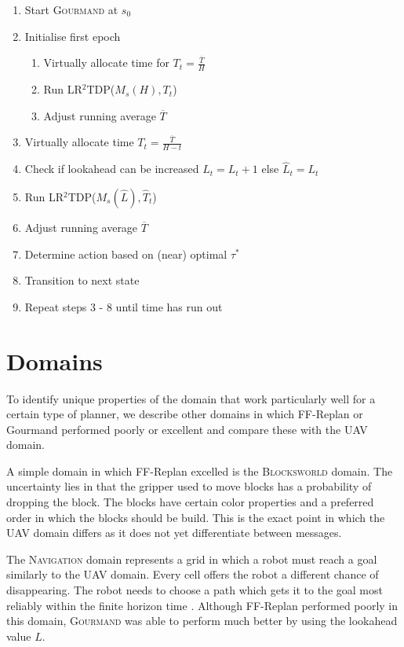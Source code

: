 \documentclass[runningheads,a4paper]{llncs}
\begin{document}
\begin{enumerate}
	\item Start \textsc{Gourmand} at $s_0$
	\item Initialise first epoch
	\begin{enumerate}
		\item Virtually allocate time for  $T_t = \frac{\overline{T}}{H}$
		\item Run LR$^2$TDP($M_s(H), T_t$)
		\item Adjust running average $\overline{T}$
	\end{enumerate}
	\item Virtually allocate time  $T_t = \frac{\overline{T}}{H - t}$
	\item Check if lookahead can be increased $\widehat{L}_t = L_t + 1$ else $\widehat{L}_t = L_t $
	\item Run LR$^2$TDP($M_s(\widehat{L}), \widehat{T}_t$)
	\item Adjust running average $\overline{T}$
	\item Determine action based on (near) optimal $\tau^*$
	\item Transition to next state
	\item Repeat steps 3 - 8 until time has run out
\end{enumerate}


\section{Domains}
\label{sec:domains}

To identify unique properties of the domain that work particularly well for a certain type of planner, we describe
other domains in which FF-Replan or Gourmand performed poorly or excellent and compare these with the UAV domain.

A simple domain in which FF-Replan excelled is the \textsc{Blocksworld}
domain. The uncertainty lies in that the gripper used to move blocks has a
probability of dropping the block. The blocks have certain color properties and
a preferred order in which the blocks should be build. This is the exact point
in which the UAV domain differs as it does not yet differentiate between messages.

The \textsc{Navigation} domain represents a grid in which a robot must reach a goal similarly to the UAV domain.
Every cell offers the robot a different chance of disappearing. The robot needs
to choose a path which gets it to the goal most reliably within the finite
horizon time \cite{sanner2011navigation}. Although FF-Replan performed poorly in this domain, \textsc{Gourmand} was
able to perform much better by using the lookahead value $L$.
\end{document}
